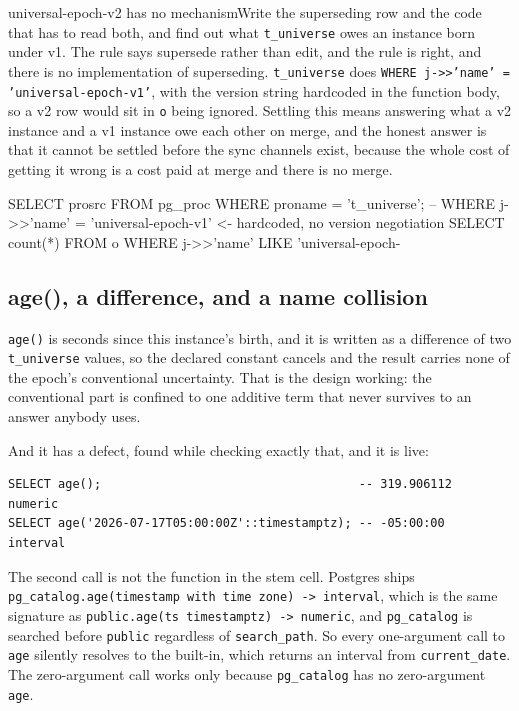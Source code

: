 \begin{Open}{universal-epoch-v2 has no mechanism}{Write the superseding row and the code that has to read both, and find out what \texttt{t\_universe} owes an instance born under v1.}
The rule says supersede rather than edit, and the rule is right, and there is no implementation of superseding. \texttt{t\_universe} does \texttt{WHERE j->>'name' = 'universal-epoch-v1'}, with the version string hardcoded in the function body, so a v2 row would sit in \texttt{o} being ignored. Settling this means answering what a v2 instance and a v1 instance owe each other on merge, and the honest answer is that it cannot be settled before the sync channels exist, because the whole cost of getting it wrong is a cost paid at merge and there is no merge.
\begin{Check}
SELECT prosrc FROM pg_proc WHERE proname = 't_universe';
  -- WHERE j->>'name' = 'universal-epoch-v1'  <- hardcoded, no version negotiation
SELECT count(*) FROM o WHERE j->>'name' LIKE 'universal-epoch-%
\end{Check}
\end{Open}

\subsection{age(), a difference, and a name collision}

\texttt{age()} is seconds since this instance's birth, and it is written as a difference of two \texttt{t\_universe} values, so the declared constant cancels and the result carries none of the epoch's conventional uncertainty. That is the design working: the conventional part is confined to one additive term that never survives to an answer anybody uses.

And it has a defect, found while checking exactly that, and it is live:

\begin{verbatim}
SELECT age();                                    -- 319.906112        numeric
SELECT age('2026-07-17T05:00:00Z'::timestamptz); -- -05:00:00         interval
\end{verbatim}

The second call is not the function in the stem cell. Postgres ships \texttt{pg\_catalog.age(timestamp with time zone) -> interval}, which is the same signature as \texttt{public.age(ts timestamptz) -> numeric}, and \texttt{pg\_catalog} is searched before \texttt{public} regardless of \texttt{search\_path}. So every one-argument call to \texttt{age} silently resolves to the built-in, which returns an interval from \texttt{current\_date}. The zero-argument call works only because \texttt{pg\_catalog} has no zero-argument \texttt{age}.

